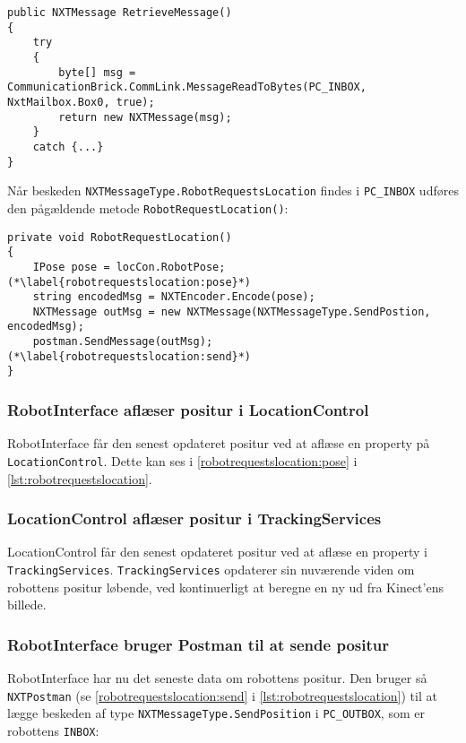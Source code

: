 \begin{lstlisting}[style=csharpsmall,label=lst:postman,caption=NXTPostman henter besked fra robot]
public NXTMessage RetrieveMessage()
{
    try
    {
        byte[] msg = CommunicationBrick.CommLink.MessageReadToBytes(PC_INBOX, NxtMailbox.Box0, true);
        return new NXTMessage(msg);
    }
    catch {...}
}
\end{lstlisting}

Når beskeden \lstinline[style=csharp]!NXTMessageType.RobotRequestsLocation! findes i \lstinline[style=csharp]!PC_INBOX! udføres den pågældende metode \lstinline[style=csharp]!RobotRequestLocation()!:

\begin{lstlisting}[style=csharpsmall,label=lst:robotrequestslocation,caption=RobotRequestsLocation() i RobotInterface]
private void RobotRequestLocation()
{
    IPose pose = locCon.RobotPose; (*\label{robotrequestslocation:pose}*)
    string encodedMsg = NXTEncoder.Encode(pose);
    NXTMessage outMsg = new NXTMessage(NXTMessageType.SendPostion, encodedMsg);
    postman.SendMessage(outMsg); (*\label{robotrequestslocation:send}*)
}
\end{lstlisting}

\subsubsection{RobotInterface aflæser positur i LocationControl}
RobotInterface får den senest opdateret positur ved at aflæse en property på \lstinline[style=csharp]!LocationControl!.
Dette kan ses i \cref{robotrequestslocation:pose} i \cref{lst:robotrequestslocation}.

\subsubsection{LocationControl aflæser positur i TrackingServices}
LocationControl får den senest opdateret positur ved at aflæse en property i \lstinline[style=csharp]!TrackingServices!.
\lstinline[style=csharp]!TrackingServices! opdaterer sin nuværende viden om robottens positur løbende, ved kontinuerligt at beregne en ny ud fra Kinect'ens billede.

\subsubsection{RobotInterface bruger Postman til at sende positur}
RobotInterface har nu det seneste data om robottens positur.
Den bruger så \lstinline[style=csharp]!NXTPostman! (se \cref{robotrequestslocation:send} i \cref{lst:robotrequestslocation}) til at lægge beskeden af type \lstinline[style=csharp]!NXTMessageType.SendPosition! i \lstinline[style=csharp]!PC_OUTBOX!, som er robottens \lstinline[style=c]!INBOX!:

